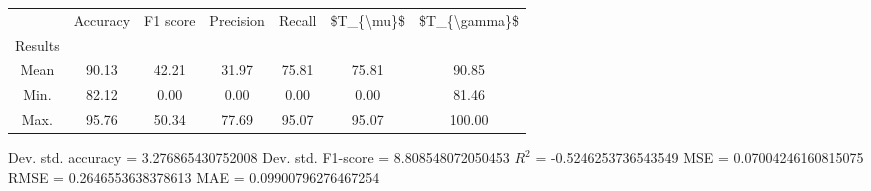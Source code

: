 \begin{tabular}{|c|c|c|c|c|c|c|}
\toprule
{} &  Accuracy &  F1 score &  Precision &  Recall &  \$T\_\{\textbackslash mu\}\$ &  \$T\_\{\textbackslash gamma\}\$ \\
Results &           &           &            &         &            &               \\
\hline
Mean    &     90.13 &     42.21 &      31.97 &   75.81 &      75.81 &         90.85 \\
Min.    &     82.12 &      0.00 &       0.00 &    0.00 &       0.00 &         81.46 \\
Max.    &     95.76 &     50.34 &      77.69 &   95.07 &      95.07 &        100.00 \\
\bottomrule
\end{tabular}

 Dev. std. accuracy = 3.276865430752008
 Dev. std. F1-score = 8.808548072050453
 $R^2$ = -0.5246253736543549
 MSE = 0.07004246160815075
 RMSE = 0.2646553638378613
 MAE = 0.09900796276467254